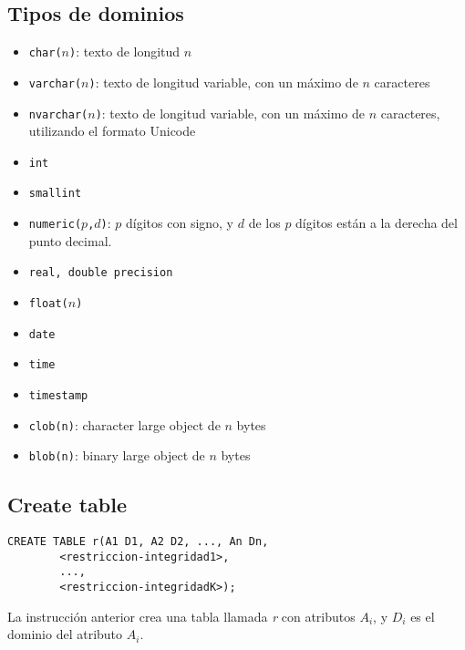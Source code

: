 \documentclass[a4paper, twoside]{article}
\begin{document}
\subsection{Tipos de dominios}
\begin{itemize}
	\item \texttt{char($n$)}: texto de longitud $n$
	\item \texttt{varchar($n$)}: texto de longitud variable, con un máximo de $n$ caracteres
	\item \texttt{nvarchar($n$)}: texto de longitud variable, con un máximo de $n$ caracteres, utilizando el formato Unicode
	\item \texttt{int}
	\item \texttt{smallint}
	\item \texttt{numeric($p$,$d$)}: $p$ dígitos con signo, y $d$ de los $p$ dígitos están a la derecha del punto decimal.
	\item \texttt{real, double precision}
	\item \texttt{float($n$)}
	\item \texttt{date}
	\item \texttt{time}
	\item \texttt{timestamp}
	\item \texttt{clob(n)}: character large object de $n$ bytes
	\item \texttt{blob(n)}: binary large object de $n$ bytes
\end{itemize}

\subsection{Create table}
\begin{lstlisting}
CREATE TABLE r(A1 D1, A2 D2, ..., An Dn,
		<restriccion-integridad1>,
		...,
		<restriccion-integridadK>);
\end{lstlisting}

La instrucción anterior crea una tabla llamada \emph{r} con atributos $A_{i}$, y $D_{i}$ es el dominio del atributo $A_{i}$.
\end{document}
